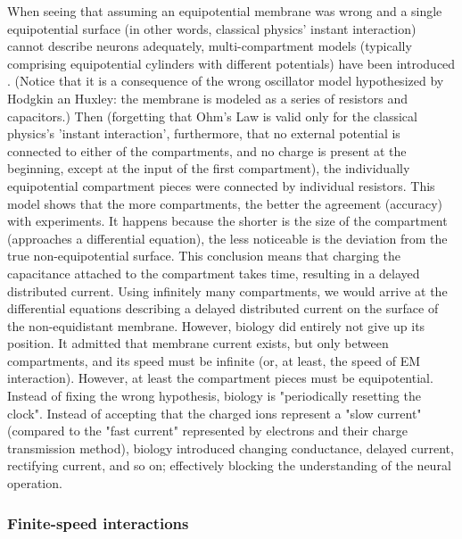 When seeing that assuming an equipotential membrane was wrong and
a single equipotential surface (in other words, classical physics' instant
interaction) cannot describe neurons adequately, multi-compartment
models (typically comprising equipotential cylinders with different
potentials) have been introduced \cite{MathNeuroscience:2010}. (Notice that it is a consequence of the wrong oscillator model hypothesized by Hodgkin an Huxley: the membrane is modeled as a series of resistors and capacitors.) Then
(forgetting that Ohm's Law is valid only for the classical physics's 'instant
interaction', furthermore, that no external potential is connected
to either of the compartments, and no charge is present at the beginning,
except at the input of the first compartment), the individually
equipotential
compartment pieces were connected by individual resistors. This model shows that
the more compartments,
the better the agreement (accuracy) with experiments.
It happens because the shorter is the size of the compartment
(approaches a differential equation), the less noticeable is the deviation
from the true non-equipotential surface. This conclusion means that
charging the capacitance attached to the compartment takes time, resulting
in a delayed distributed current. Using infinitely many
compartments, we would arrive at the differential equations describing
a delayed distributed current on the surface of the non-equidistant
membrane. However, biology did entirely not give up its position.
It admitted that membrane current exists, but only between compartments,
and its speed must be infinite (or, at least, the speed of 
 \gls{EM}
interaction). However, at least the compartment pieces must be equipotential.
Instead of fixing the wrong hypothesis, biology is "periodically
resetting the clock". Instead of accepting that the charged ions
represent a "slow current" (compared to the "fast current" represented by electrons and their charge transmission method), biology introduced changing conductance, delayed current, rectifying current, and so on; effectively blocking
the understanding of the neural operation.

\subsubsection[In interactions]{Finite-speed interactions\label{PHYSICS_SPEEDS_FINITE}}

